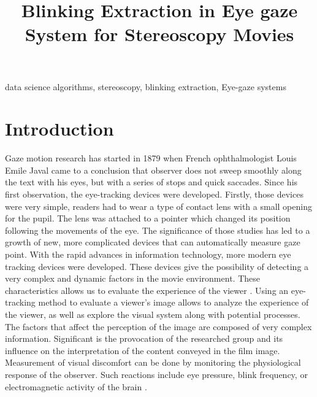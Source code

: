 \documentclass[conference]{IEEEtran}
\begin{document}
\title{Blinking Extraction in Eye gaze System for Stereoscopy Movies}

\author{
\and
{}
}

\maketitle


\begin{IEEEkeywords}
data science algorithms, stereoscopy, blinking extraction, Eye-gaze systems
\end{IEEEkeywords}

\section{Introduction}
Gaze motion research has started in 1879 when French ophthalmologist Louis Emile Javal came to a conclusion that observer does not sweep smoothly along the text with his eyes, but with a series of stops and quick saccades\cite{Winery}.  Since his first observation, the eye-tracking devices were developed. Firstly, those devices were very simple, readers had to wear a type of contact lens with a small opening for the pupil. The lens was attached to a pointer which changed its position following the movements of the eye. The significance of those studies has led to a growth of new, more complicated devices that can automatically measure gaze point. With the rapid advances in information technology, more modern eye tracking devices were developed. These devices give the possibility of detecting a very complex and dynamic factors in the movie environment. These characteristics allows us to evaluate the experience of the viewer \cite{mital2011clustering}.
Using an eye-tracking method to evaluate a viewer's image allows to analyze the experience of the viewer, as well as explore the visual system along with potential processes.
The factors that affect the perception of the image are composed of very complex information. Significant is the provocation of the researched group and its influence on the interpretation of the content conveyed in the film image. Measurement of visual discomfort can be done by monitoring the physiological response of the observer. Such reactions include eye pressure, blink frequency, or electromagnetic activity of the brain \cite{Fornalczyk_Napieralski_Szajerman_Wojciechowski_2015, Fornalczyk_Napieralski_Szajerman_Wojciechowski_20152}.
\end{document}
